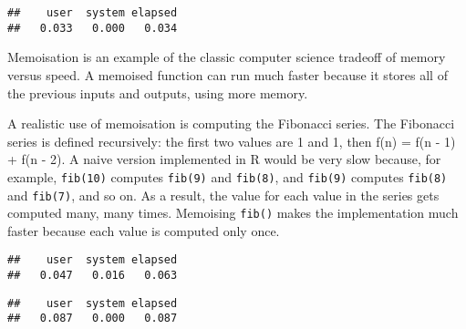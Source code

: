 \begin{verbatim}
##    user  system elapsed 
##   0.033   0.000   0.034
\end{verbatim}

Memoisation is an example of the classic computer science tradeoff of
memory versus speed. A memoised function can run much faster because it
stores all of the previous inputs and outputs, using more memory.

A realistic use of memoisation is computing the Fibonacci series. The
Fibonacci series is defined recursively: the first two values are 1 and
1, then f(n) = f(n - 1) + f(n - 2). A naive version implemented in R
would be very slow because, for example, \texttt{fib(10)} computes
\texttt{fib(9)} and \texttt{fib(8)}, and \texttt{fib(9)} computes
\texttt{fib(8)} and \texttt{fib(7)}, and so on. As a result, the value
for each value in the series gets computed many, many times. Memoising
\texttt{fib()} makes the implementation much faster because each value
is computed only once. 

\begin{Shaded}
\begin{Highlighting}[]
\StringTok{ }
  \OperatorTok{<}\StringTok{ }\NormalTok{) }\NormalTok{(}\NormalTok{)}
  \OperatorTok{-}\StringTok{ }\NormalTok{) }\OperatorTok{+}\StringTok{ }\OperatorTok{-}\StringTok{ }\NormalTok{)}
\NormalTok{\}}
\NormalTok{(}\NormalTok{(}\NormalTok{))}
\end{Highlighting}
\end{Shaded}

\begin{verbatim}
##    user  system elapsed 
##   0.047   0.016   0.063
\end{verbatim}

\begin{Shaded}
\begin{Highlighting}[]
\NormalTok{(}\NormalTok{(}\NormalTok{))}
\end{Highlighting}
\end{Shaded}

\begin{verbatim}
##    user  system elapsed 
##   0.087   0.000   0.087
\end{verbatim}

